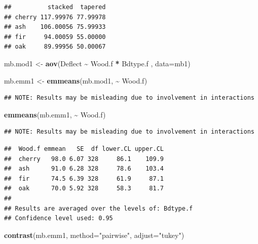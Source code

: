 \documentclass[
]{book}
\newenvironment{Shaded}{\begin{snugshade}}{\end{snugshade}}
\newcommand{\AttributeTok}[1]{\textcolor[rgb]{0.13,0.29,0.53}{#1}}
\newcommand{\FunctionTok}[1]{\textcolor[rgb]{0.13,0.29,0.53}{\textbf{#1}}}
\newcommand{\NormalTok}[1]{#1}
\newcommand{\OtherTok}[1]{\textcolor[rgb]{0.56,0.35,0.01}{#1}}
\newcommand{\SpecialCharTok}[1]{\textcolor[rgb]{0.81,0.36,0.00}{\textbf{#1}}}
\newcommand{\StringTok}[1]{\textcolor[rgb]{0.31,0.60,0.02}{#1}}
\begin{document}
\begin{verbatim}
##          stacked  tapered
## cherry 117.99976 77.99978
## ash    106.00056 75.99933
## fir     94.00059 55.00000
## oak     89.99956 50.00067
\end{verbatim}

\begin{Shaded}
\begin{Highlighting}[]
\NormalTok{mb.mod1 }\OtherTok{\textless{}{-}} \FunctionTok{aov}\NormalTok{(Deflect }\SpecialCharTok{\textasciitilde{}}\NormalTok{ Wood.f }\SpecialCharTok{*}\NormalTok{ Bdtype.f , }\AttributeTok{data=}\NormalTok{mb1)}

\NormalTok{mb.emm1 }\OtherTok{\textless{}{-}} \FunctionTok{emmeans}\NormalTok{(mb.mod1, }\SpecialCharTok{\textasciitilde{}}\NormalTok{ Wood.f)}
\end{Highlighting}
\end{Shaded}

\begin{verbatim}
## NOTE: Results may be misleading due to involvement in interactions
\end{verbatim}

\begin{Shaded}
\begin{Highlighting}[]
\FunctionTok{emmeans}\NormalTok{(mb.emm1, }\SpecialCharTok{\textasciitilde{}}\NormalTok{ Wood.f)}
\end{Highlighting}
\end{Shaded}

\begin{verbatim}
## NOTE: Results may be misleading due to involvement in interactions
\end{verbatim}

\begin{verbatim}
##  Wood.f emmean   SE  df lower.CL upper.CL
##  cherry   98.0 6.07 328     86.1    109.9
##  ash      91.0 6.28 328     78.6    103.4
##  fir      74.5 6.39 328     61.9     87.1
##  oak      70.0 5.92 328     58.3     81.7
## 
## Results are averaged over the levels of: Bdtype.f 
## Confidence level used: 0.95
\end{verbatim}

\begin{Shaded}
\begin{Highlighting}[]
\FunctionTok{contrast}\NormalTok{(mb.emm1, }\AttributeTok{method=}\StringTok{"pairwise"}\NormalTok{, }\AttributeTok{adjust=}\StringTok{"tukey"}\NormalTok{)}
\end{Highlighting}
\end{Shaded}
\end{document}
